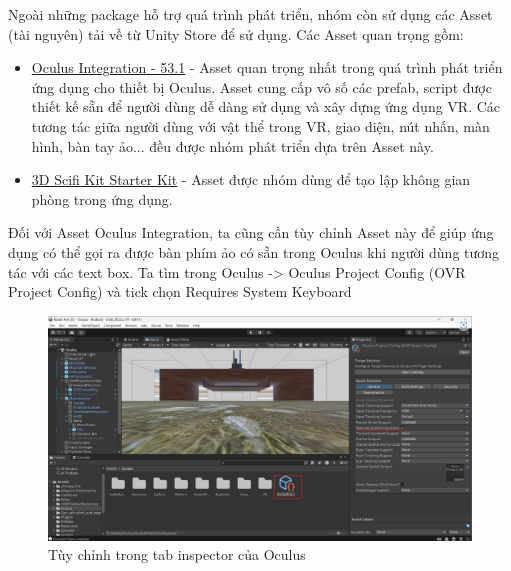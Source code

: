 Ngoài những package hỗ trợ quá trình phát triển, nhóm còn sử dụng các Asset (tài nguyên) tải về từ Unity Store để sử dụng. Các Asset quan trọng gồm:
\begin{itemize}
    \item \href{https://assetstore.unity.com/packages/tools/integration/oculus-integration-82022}{Oculus Integration - 53.1} - Asset quan trọng nhất trong quá trình phát triển ứng dụng cho thiết bị Oculus. Asset cung cấp vô số các prefab, script được thiết kế sẵn để người dùng dễ dàng sử dụng và xây dựng ứng dụng VR. Các tương tác giữa người dùng với vật thể trong VR, giao diện, nút nhấn, màn hình, bàn tay ảo... đều được nhóm phát triển dựa trên Asset này.
    \item \href{https://assetstore.unity.com/packages/p/3d-scifi-kit-starter-kit-92152}{3D Scifi Kit Starter Kit} - Asset được nhóm dùng để tạo lập không gian phòng trong ứng dụng.
\end{itemize}

Đối với Asset Oculus Integration, ta cũng cần tùy chỉnh Asset này để giúp ứng dụng có thể gọi ra được bàn phím ảo có sẵn trong Oculus khi người dùng tương tác với các text box. Ta tìm trong Oculus -> Oculus Project Config (OVR Project Config) và tick chọn Requires System Keyboard

\begin{figure}[H]
    \centering
    \includegraphics[width=1\textwidth]{Images/Implementation/VRapp/unityasset_0.jpg}
    \caption{Tùy chỉnh trong tab inspector của Oculus}
    \label{fig:unityasset_0}
\end{figure}












